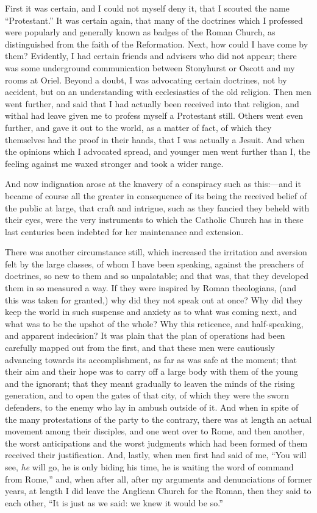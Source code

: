 First it was certain, and I could not myself deny it, that I
scouted the name ``Protestant.'' It was certain again, that
many of the doctrines which I professed were popularly and generally
known as badges of the Roman Church, as distinguished from the faith
of the Reformation. Next, how could I have come by them? Evidently, I
had certain friends and advisers who did not appear; there was some
underground communication between Stonyhurst or Oscott and my rooms at
Oriel. Beyond a doubt, I was advocating certain doctrines, not by
accident, but on an understanding with ecclesiastics of the old
religion. Then men went further, and said that I had actually been
received into that religion, and withal had leave given me to profess
myself a Protestant still. Others went even further, and gave it out
to the world, as a matter of fact, of which they themselves had the
proof in their hands, that I was actually a Jesuit. And when the
opinions which I advocated spread, and younger men went further than
I, the feeling against me waxed stronger and took a wider range.

And now indignation arose at the knavery of a conspiracy such as
this:—and it became of course all the greater in consequence of
its being the received belief of the public at large, that craft and
intrigue, such as they fancied they beheld with their eyes,
were the very instruments to which the Catholic Church has in these
last centuries been indebted for her maintenance and extension.

There was another circumstance still, which increased the
irritation and aversion felt by the large classes, of whom I have been
speaking, against the preachers of doctrines, so new to them and so unpalatable; and that
was, that they developed them in so measured a way. If they were
inspired by Roman theologians, (and this was taken for granted,) why
did they not speak out at once? Why did they keep the world in such
suspense and anxiety as to what was coming next, and what was to be
the upshot of the whole? Why this reticence, and half-speaking, and
apparent indecision? It was plain that the plan of operations had been
carefully mapped out from the first, and that these men were
cautiously advancing towards its accomplishment, as far as was safe at
the moment; that their aim and their hope was to carry off a large
body with them of the young and the ignorant; that they meant
gradually to leaven the minds of the rising generation, and to open
the gates of that city,
of which they were the sworn defenders, to the enemy who lay in ambush
outside of it. And when in spite of the many protestations of the
party to the contrary, there was at length an actual movement among
their disciples, and one went over to Rome, and then another, the
worst anticipations and the worst judgments which had been formed of
them received their justification. And, lastly, when men first had
said of me, ``You will see, \emph{he} will go, he is only biding
his time, he is waiting the word of command from Rome,'' and, when
after all, after my arguments and denunciations of former years, at
length I did leave the Anglican Church for the Roman, then they said
to each other, ``It is just as we said: we knew it would be so.''

